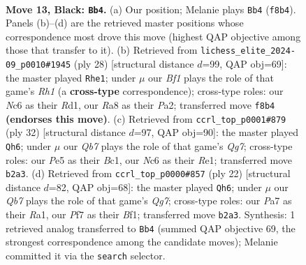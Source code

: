 \documentclass[11pt]{article}
\begin{document}
\begin{figure}[p]\centering
\begin{subfigure}{0.46\textwidth}\centering
\resizebox{\linewidth}{!}{%
\newchessgame
\chessboard[
  setfen={r1bk1b1r/pp3p1p/2n2N2/4p3/3p4/3P1N2/PqPQ1PPP/2R1K2R b K - 2 13},
  showmover=false,
  pgfstyle=straightmove, color=movearrow, markmove={f8-b4}
]}
\caption{}
\end{subfigure}\hfill
\begin{subfigure}{0.46\textwidth}\centering
\resizebox{\linewidth}{!}{%
\newchessgame
\chessboard[
  setfen={r3k2r/pp1q1pp1/2nPp3/5nBp/4Q2P/5N2/PPP2PP1/2KR3R w kq - 1 15},
  showmover=false,
  pgfstyle=straightmove, color=movearrow, markmove={h1-e1}
]}
\caption{}
\end{subfigure}
\\[4pt]
\begin{subfigure}{0.46\textwidth}\centering
\resizebox{\linewidth}{!}{%
\newchessgame
\chessboard[
  setfen={r3k1r1/1p1qbpQp/4pn2/2p5/p3P3/2N4P/1PP2PP1/R1B1R1K1 w q - 1 17},
  showmover=false,
  pgfstyle=straightmove, color=movearrow, markmove={g7-h6}
]}
\caption{}
\end{subfigure}\hfill
\begin{subfigure}{0.46\textwidth}\centering
\resizebox{\linewidth}{!}{%
\newchessgame
\chessboard[
  setfen={r1bqk1r1/1pp1npQp/3p4/p2P4/4n3/P4N2/1P3PPP/R1B1KB1R w KQq - 1 12},
  showmover=false,
  pgfstyle=straightmove, color=movearrow, markmove={g7-h6}
]}
\caption{}
\end{subfigure}
\caption{\textbf{Move 13, Black: \texttt{Bb4}.} (a) Our position; Melanie plays \texttt{Bb4} (\texttt{f8b4}). Panels (b)--(d) are the retrieved master positions whose correspondence most drove this move (highest QAP objective among those that transfer to it). (b) Retrieved from \texttt{lichess\_elite\_2024-09\_p0010\#1945} (ply 28) [structural distance $d$=99, QAP obj=69]: the master played \texttt{Rhe1}; under $\mu$ our \emph{Bf1} plays the role of that game's \emph{Rh1} (a \textbf{cross-type} correspondence); cross-type roles: our \emph{N}c6 as their \emph{R}d1, our \emph{R}a8 as their \emph{P}a2; transferred move \texttt{f8b4} \textbf{(endorses this move)}. (c) Retrieved from \texttt{ccrl\_top\_p0001\#879} (ply 32) [structural distance $d$=97, QAP obj=90]: the master played \texttt{Qh6}; under $\mu$ our \emph{Qb7} plays the role of that game's \emph{Qg7}; cross-type roles: our \emph{P}e5 as their \emph{B}c1, our \emph{N}c6 as their \emph{R}e1; transferred move \texttt{b2a3}. (d) Retrieved from \texttt{ccrl\_top\_p0000\#857} (ply 22) [structural distance $d$=82, QAP obj=68]: the master played \texttt{Qh6}; under $\mu$ our \emph{Qb7} plays the role of that game's \emph{Qg7}; cross-type roles: our \emph{P}a7 as their \emph{R}a1, our \emph{P}f7 as their \emph{B}f1; transferred move \texttt{b2a3}. Synthesis: 1 retrieved analog transferred to \texttt{Bb4} (summed QAP objective 69, the strongest correspondence among the candidate moves); Melanie committed it via the \texttt{search} selector.}
\label{fig:thought-m25}
\end{figure}
\end{document}
